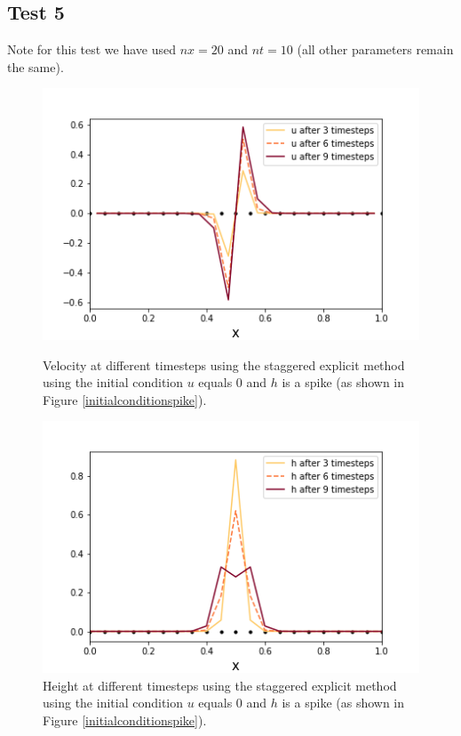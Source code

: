 \documentclass[a4paper,12pt, notitlepage]{article}
\begin{document}
{\subsection{Test 5}
Note for this test we have used $nx = 20$ and $nt = 10$ (all other parameters remain the same).
\begin{figure} [H]
	\begin{minipage}{.5\textwidth}
		\ContinuedFloat*
		\captionsetup{width=0.9\textwidth}
		\captionsetup{justification=centering}
		\includegraphics[width=\textwidth]{velocity_staggered_explicit_spike.png}
		\caption{\label{velocity_staggered_explicit_spike} Velocity at different timesteps using the staggered explicit method using the initial condition $u$ equals 0 and $h$ is a spike (as shown in Figure \ref{initialconditionspike}).} 
	\end{minipage}
	\begin{minipage}{.5\textwidth}
		\ContinuedFloat
		\captionsetup{width=0.9\textwidth}
		\captionsetup{justification=centering}
		\includegraphics[width=\textwidth]{height_staggered_explicit_spike.png}
		\caption{\label{height_staggered_explicit_spike} Height at different timesteps using the staggered explicit method using the initial condition $u$ equals 0 and $h$ is a spike (as shown in Figure \ref{initialconditionspike}).} 
	\end{minipage}
\end{figure}

}
\end{document}
